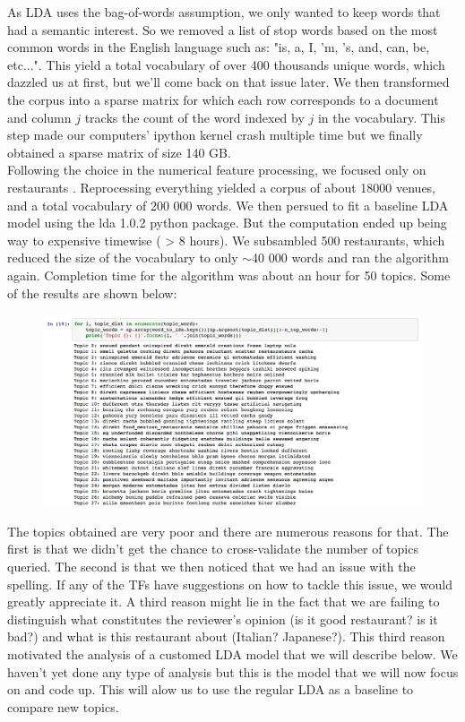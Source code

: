 \documentclass[paper=a4, fontsize=11pt]{scrartcl} %
\numberwithin{equation}{section}
\numberwithin{figure}{section}
\numberwithin{table}{section}
\begin{document}
As LDA uses the bag-of-words assumption, we only wanted to keep words that had a semantic interest. So we removed a list of stop words based on the most common words in the English language such as: "is, a, I, 'm, 's, and, can, be, etc...". This yield a total vocabulary of over 400 thousands unique words, which dazzled us at first, but we'll come back on that issue later. We then transformed the corpus into a sparse matrix for which each row corresponds to a document and column $j$ tracks the count of the word indexed by $j$ in the vocabulary. This step made our computers' ipython kernel crash multiple time but we finally obtained a sparse matrix of size 140 GB.\\

Following the choice in the numerical feature processing, we focused only on restaurants . Reprocessing everything yielded a corpus of about 18000 venues, and a total vocabulary of 200 000 words. We then persued to fit a baseline LDA model using the lda 1.0.2 python package. But the computation ended up being way to expensive timewise ( > 8 hours). We subsambled 500 restaurants, which reduced the size of the vocabulary to only $\sim$40 000 words and ran the algorithm again. Completion time for the algorithm was about an hour for 50 topics. Some of the results are shown below:

\begin{figure}[h!]
\centering
\includegraphics[width=1\textwidth]{first_topics.png}
\end{figure}

The topics obtained are very poor and there are numerous reasons for that. The first is that we didn't get the chance to cross-validate the number of topics queried. The second is that we then noticed that we had an issue with the spelling. If any of the TFs have suggestions on how to tackle this issue, we would greatly appreciate it. A third reason might lie in the fact that we are failing to distinguish what constitutes the reviewer's opinion (is it good restaurant? is it bad?) and what is this restaurant about (Italian? Japanese?). This third reason motivated the analysis of a customed LDA model that we will describe below. We haven't yet done any type of analysis but this is the model that we will now focus on and code up. This will alow us to use the regular LDA as a baseline to compare new topics.\\
\end{document}
